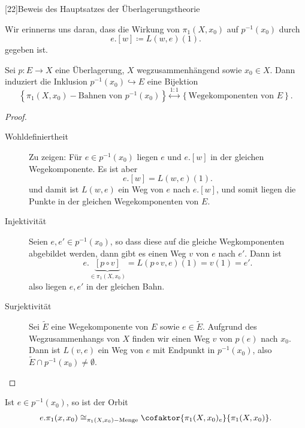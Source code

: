 [22]{Beweis des Hauptsatzes der Überlagerungstheorie}

Wir erinnerns uns daran, dass die Wirkung von $\pi_1(X,x_0)$ auf $p^{-1} (x_0)$ durch
\[
    e.[w] \coloneqq  L(w,e)(1)
.\] 
gegeben ist.

\begin{proposition}\label{prop:wegekomponenten-von-überlagerungsraum-sind-bahnen-von-faser-bezüglich-fundamentalgruppe-wenn-basisraum-wegzusammenhängend}
    Sei $p\colon E\to X$ eine Überlagerung,  $X$ wegzusammenhängend sowie  $x_0\in X$. Dann induziert die Inklusion $p^{-1} (x_0) \hookrightarrow E$ eine Bijektion
    \[
        \left \{\pi_1(X,x_0) - \text{Bahnen von } p^{-1} (x_0) \right\}  \stackrel{1:1}{\longleftrightarrow} \left \{\text{Wegekomponenten von } E\right\} 
    .\] 
\end{proposition}

\begin{proof}
    \begin{description}
        \item[Wohldefiniertheit] Zu zeigen: Für $e\in p^{-1} (x_0)$ liegen $e$ und  $e.[w]$ in der gleichen Wegekomponente. Es ist aber
             \[
                 e.[w] = L(w,e)(1)
            .\] 
            und damit ist $L(w,e)$ ein Weg von  $e$ nach  $e.[w]$, und somit liegen die Punkte in der gleichen Wegekomponenten von  $E$.
        \item[Injektivität] Seien  $e,e'\in p^{-1} (x_0)$, so dass diese auf die gleiche Wegkomponenten abgebildet werden, dann gibt es einen Weg $v$ von  $e$ nach  $e'$. Dann ist
             \[
                 e.\underbrace{[p \circ  v]}_{\in \pi_1(X,x_0)}  = L(p \circ  v, e)(1) = v(1) = e'
            .\] 
            also liegen $e,e'$ in der gleichen Bahn.
        \item[Surjektivität] Sei  $\tilde{E}$ eine Wegekomponente von $E$ sowie  $e\in \tilde{E}$. Aufgrund des Wegzusammenhangs von $X$ finden wir einen Weg  $v$ von  $p(e)$ nach  $x_0$. Dann ist $L(v,e)$ ein Weg von  $e$ mit Endpunkt in  $p^{-1} (x_0)$, also $\tilde{E} \cap  p^{-1} (x_0) \neq  \emptyset$.
    \end{description}
\end{proof}

Ist $e\in p^{-1} (x_0)$, so ist der Orbit
\[
    e.\pi_1(x,x_0) \cong_{\pi_1(X,x_0)-\text{Menge}} \cofaktor{\pi_1(X,x_0)_e}{\pi_1(X,x_0)}
.\] 


